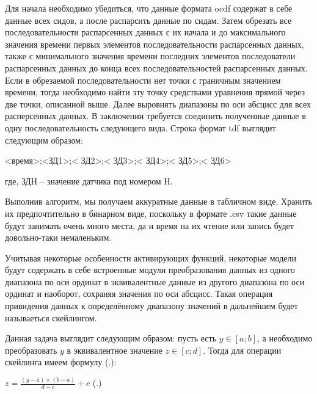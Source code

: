 {  \par \redline Для начала необходимо убедиться, что данные формата ocdf содержат в себе данные всех сидов, а после распарсить данные по сидам. Затем обрезать все последовательности распарсенных данных с их начала и до максимального значения времени первых элементов последовательности распарсенных данных, также с минимального значения времени последних элементов последователи распарсенных данных до конца всех последовательностей распарсенных данных. Если в обрезаемой последовательности нет точки с граничным значением времени, тогда необходимо найти эту точку средствами уравнения прямой через две точки, описанной выше. Далее выровнять диапазоны по оси абсцисс для всех расперсенных данных. В заключении требуется соединить полученные данные в одну последовательность следующего вида. Строка формат tdf выглядит следующим образом:

  \formulaspace
  \begin{Center}
  <время>;<ЗД1>;< ЗД2>;< ЗД3>;< ЗД4>;< ЗД5>;< ЗД6>
  \end{Center}
  \formulaspace

  \par \redline где, ЗДН – значение датчика под номером Н. 

  \par \redline Выполнив алгоритм, мы получаем аккуратные данные в табличном виде. Хранить их предпочтительно в бинарном виде, поскольку в формате .csv такие данные будут занимать очень много места, да и время на их чтение или запись будет довольно-таки немаленьким. 

  \par \redline Учитывая некоторые особенности активирующих функций, некоторые модели будут содержать в себе встроенные модули преобразования данных из одного диапазона по оси ординат в эквивалентные данные из другого диапазона по оси ординат и наоборот, сохраняя значения по оси абсцисс. Такая операция привидения данных к определённому диапазону значений в дальнейшем будет называеться скейлингом.

  \par \redline Данная задача выглядит следующим образом: пусть есть $y \in \left[a; b\right]$, а необходимо преобразовать $y$ в эквивалентное значение $z \in \left[c; d\right]$. Тогда для операции скейлинга имеем формулу (\thechaptercntr .\theformulacntr):

  \formulaspace \par \redline 
    $z = \frac{\left(y - a\right) \times \left(b - a\right)}{d - c} + c$
    \hfill (\thechaptercntr .\theformulacntr) \redline
  \formulaspace \addtocounter{formulacntr}{1}

}
